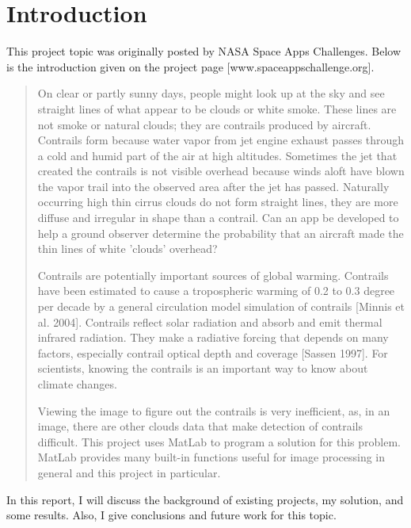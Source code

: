 \chapter{Introduction}

This project topic was originally posted by NASA Space Apps Challenges. 
Below is the introduction given on the project page [www.spaceappschallenge.org].
\begin{quote}
On clear or partly sunny days, people might look up at the sky and see straight 
lines of what appear to be clouds or white smoke. These lines are not smoke 
or natural clouds; they are contrails produced by aircraft. Contrails form 
because water vapor from jet engine exhaust passes through a cold and humid 
part of the air at high altitudes. Sometimes the jet that created the contrails 
is not visible overhead because winds aloft have blown the vapor trail into 
the observed area after the jet has passed. Naturally occurring high thin 
cirrus clouds do not form straight lines, they are more diffuse and irregular 
in shape than a contrail. Can an app be developed to help a ground observer 
determine the probability that an aircraft made the thin lines 
of white 'clouds' overhead?

Contrails are potentially important sources of global warming. Contrails have 
been estimated to cause a tropospheric warming of 0.2 to 0.3 degree per decade 
by a general circulation model simulation of contrails [Minnis et al. 2004]. 
Contrails reflect solar radiation and absorb and emit thermal infrared radiation. 
They make a radiative forcing that depends on many factors, especially contrail 
optical depth and coverage [Sassen 1997]. For scientists, knowing the contrails 
is an important way to know about climate changes. 

Viewing the image to figure out the contrails is very inefficient, as, in an image, 
there are other clouds data that make detection of contrails difficult. This 
project uses MatLab to program a solution for this problem. MatLab provides 
many built-in functions useful for image processing in general and this project 
in particular. 
\end{quote}

In this report, I will discuss the background of existing projects, my solution, 
and some results. Also, I give conclusions and future work for this topic.
